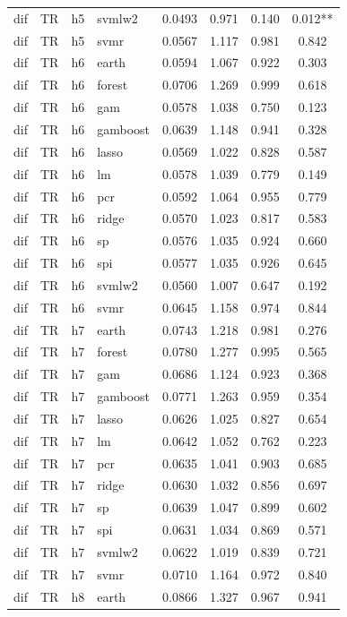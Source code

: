 \begin{ThreePartTable}
\begin{longtable}[t]{llclcccc}
dif & TR & h5 & svmlw2 & 0.0493 & 0.971 & 0.140 & 0.012**\\
dif & TR & h5 & svmr & 0.0567 & 1.117 & 0.981 & 0.842\\
\addlinespace
dif & TR & h6 & earth & 0.0594 & 1.067 & 0.922 & 0.303\\
dif & TR & h6 & forest & 0.0706 & 1.269 & 0.999 & 0.618\\
dif & TR & h6 & gam & 0.0578 & 1.038 & 0.750 & 0.123\\
dif & TR & h6 & gamboost & 0.0639 & 1.148 & 0.941 & 0.328\\
dif & TR & h6 & lasso & 0.0569 & 1.022 & 0.828 & 0.587\\
dif & TR & h6 & lm & 0.0578 & 1.039 & 0.779 & 0.149\\
dif & TR & h6 & pcr & 0.0592 & 1.064 & 0.955 & 0.779\\
dif & TR & h6 & ridge & 0.0570 & 1.023 & 0.817 & 0.583\\
dif & TR & h6 & sp & 0.0576 & 1.035 & 0.924 & 0.660\\
dif & TR & h6 & spi & 0.0577 & 1.035 & 0.926 & 0.645\\
dif & TR & h6 & svmlw2 & 0.0560 & 1.007 & 0.647 & 0.192\\
dif & TR & h6 & svmr & 0.0645 & 1.158 & 0.974 & 0.844\\
\addlinespace
dif & TR & h7 & earth & 0.0743 & 1.218 & 0.981 & 0.276\\
dif & TR & h7 & forest & 0.0780 & 1.277 & 0.995 & 0.565\\
dif & TR & h7 & gam & 0.0686 & 1.124 & 0.923 & 0.368\\
dif & TR & h7 & gamboost & 0.0771 & 1.263 & 0.959 & 0.354\\
dif & TR & h7 & lasso & 0.0626 & 1.025 & 0.827 & 0.654\\
dif & TR & h7 & lm & 0.0642 & 1.052 & 0.762 & 0.223\\
dif & TR & h7 & pcr & 0.0635 & 1.041 & 0.903 & 0.685\\
dif & TR & h7 & ridge & 0.0630 & 1.032 & 0.856 & 0.697\\
dif & TR & h7 & sp & 0.0639 & 1.047 & 0.899 & 0.602\\
dif & TR & h7 & spi & 0.0631 & 1.034 & 0.869 & 0.571\\
dif & TR & h7 & svmlw2 & 0.0622 & 1.019 & 0.839 & 0.721\\
dif & TR & h7 & svmr & 0.0710 & 1.164 & 0.972 & 0.840\\
\addlinespace
dif & TR & h8 & earth & 0.0866 & 1.327 & 0.967 & 0.941\\

\end{longtable}
\end{ThreePartTable}
